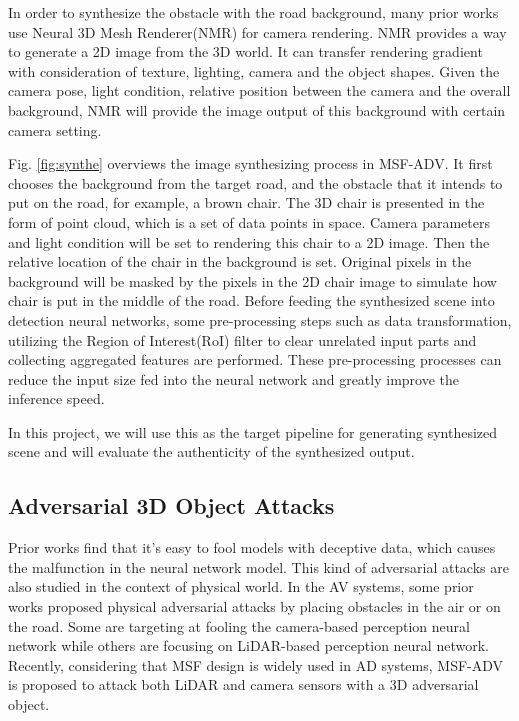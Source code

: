 In order to synthesize the obstacle with the road background, many prior works\cite{msf-adv} use Neural 3D Mesh Renderer(NMR) for camera rendering\cite{nmr}.
NMR provides a way to generate a 2D image from the 3D world. 
It can transfer rendering gradient with consideration of texture, lighting, camera and the object shapes.
Given the camera pose, light condition, relative position between the camera and the overall background, 
NMR will provide the image output of this background with certain camera setting. 

Fig. \ref{fig:synthe} overviews the image synthesizing process in MSF-ADV\cite{msf-adv}.
It first chooses the background from the target road, and the obstacle that it intends to put on the road, for example, a brown chair.
The 3D chair is presented in the form of point cloud, which is a set of data points in space.
Camera parameters and light condition will be set to rendering this chair to a 2D image. 
Then the relative location of the chair in the background is set. 
Original pixels in the background will be masked by the pixels in the 2D chair image to simulate how chair is put in the middle of the road.
Before feeding the synthesized scene into detection neural networks, some pre-processing steps such as data transformation,
utilizing the Region of Interest(RoI) filter to clear unrelated input parts and collecting aggregated features are performed.
These pre-processing processes can reduce the input size fed into the neural network and greatly improve the inference speed.

In this project, we will use this as the target pipeline for generating synthesized scene and will evaluate the authenticity of the synthesized output.


\subsection{Adversarial 3D Object Attacks}

Prior works find that it's easy to fool models with deceptive data, which causes the malfunction in the neural network model.
This kind of adversarial attacks are also studied in the context of physical world\cite{adv1, adv2, adv3}.
In the AV systems, some prior works proposed physical adversarial attacks by placing obstacles in the air or on the road\cite{adv1, adv2, adv3}.
Some are targeting at fooling the camera-based perception neural network\cite{adv1, adv2, adv3} while others are focusing on LiDAR-based perception neural network\cite{lidar1, 6}.
Recently, considering that MSF design is widely used in AD systems, MSF-ADV\cite{msf-adv} is proposed to attack both LiDAR and camera sensors with a 3D adversarial object.


